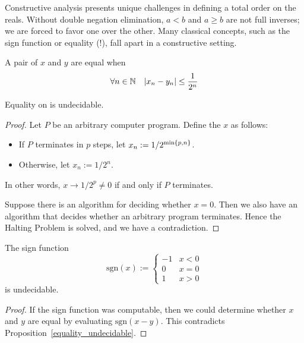 \documentclass[leqno]{report}
\begin{document}
Constructive analysis presents unique challenges in defining a total order on the reals. Without double negation elimination, $a < b$ and $a \geq b$ are not full inverses; we are forced to favor one over the other. Many classical concepts, such as the sign function or equality (!), fall apart in a constructive setting.

\begin{Definition}[Equality]
    A pair of \FCCS{} $x$ and $y$ are equal when
    \[
        \forall {n \in \mathbb{N}} \quad {\left| x_n - y_n \right| \leq \frac{1}{2^n}}
    \]
\end{Definition}

\begin{Proposition} \label{equality_undecidable}
    Equality on \FCCS{} is undecidable.
\end{Proposition}

\begin{proof}
    Let $P$ be an arbitrary computer program. Define the \FCCS{} $x$ as follows:
    \begin{itemize}
        \item If $P$ terminates in $p$ steps, let $x_n := 1/2^{\min\left\{ p, n \right\}}$.
        \item Otherwise, let $x_n := 1/2^n$.
    \end{itemize}
    In other words, $x \rightarrow 1/2^p \neq 0$ if and only if $P$ terminates.

    Suppose there is an algorithm for deciding whether $x = 0$. Then we also have an algorithm that decides whether an arbitrary program terminates. Hence the Halting Problem is solved, and we have a contradiction.
\end{proof}

\begin{Corollary}
    The sign function
    \[
        \mathrm{sgn}(x) := \begin{cases}
            -1 & x < 0 \\
            0 & x = 0 \\
            1 & x > 0
        \end{cases}
    \]
    is undecidable.
\end{Corollary}

\begin{proof}
    If the sign function was computable, then we could determine whether $x$ and $y$ are equal by evaluating $\mathrm{sgn}(x - y)$. This contradicts Proposition~\ref{equality_undecidable}.
\end{proof}
\end{document}
